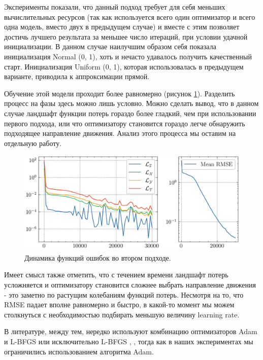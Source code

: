 \documentclass[a4paper, 12pt]{article}
\begin{document}
Эксперименты показали, что данный подход требует для себя меньших вычислительных ресурсов (так как используется всего один оптимизатор и всего одна модель, вместо двух в предыдущем случае) и вместе с этим позволяет достичь лучшего результата за меньшее число итераций, при условии удачной инициализации. В данном случае наилучшим образом себя показала инициализация Normal (0, 1), хоть и нечасто удавалось получить качественный старт. Инициализация Uniform (0, 1), которая использовалась в предыдущем варианте, приводила к аппроксимации прямой.

Обучение этой модели проходит более равномерно (рисунок \ref{fig:lotkavolterra:second:losses}). Разделить процесс на фазы здесь можно лишь условно. Можно сделать вывод, что в данном случае ландшафт функции потерь гораздо более гладкий, чем при использовании первого подхода, или что оптимизатору становится гораздо легче обнаружить подходящее направление движения. Анализ этого процесса мы оставим на отдельную работу.

\begin{figure}[h]
    \centering
    \includegraphics{../Differential Equation Solution/images/lotkavolterra/second approach/Losses.png}
    \caption{Динамика функций ошибок во втором подходе.}
    \label{fig:lotkavolterra:second:losses}
\end{figure}

Имеет смысл также отметить, что с течением времени ландшафт потерь усложняется и оптимизатору становится сложнее выбрать направление движения - это заметно по растущим колебаниям функций потерь. Несмотря на то, что RMSE падает вполне равномерно и быстро, в какой-то момент мы можем столкнуться с необходимостью подбирать меньшую величину learning rate. 

В литературе, между тем, нередко используют комбинацию оптимизаторов Adam и L-BFGS или исключительно L-BFGS \cite{Cuomo2022}, \cite{RAISSI2019686}, тогда как в наших экспериментах мы ограничились использованием алгоритма Adam.
\end{document}

